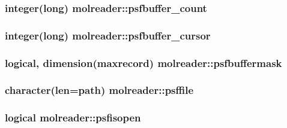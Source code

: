 \hypertarget{classmolreader_af2dddaa7f6249a39287ffcdcbe2ce558}{
\subsubsection[{psfbuffer\+\_\+count}]{\setlength{\rightskip}{0pt plus 5cm}integer(long) molreader\+::psfbuffer\+\_\+count\hspace{0.3cm}{\ttfamily [private]}}}\label{classmolreader_af2dddaa7f6249a39287ffcdcbe2ce558}
\hypertarget{classmolreader_ab080c636a2423beb139bdd65dcd884c3}{
\subsubsection[{psfbuffer\+\_\+cursor}]{\setlength{\rightskip}{0pt plus 5cm}integer(long) molreader\+::psfbuffer\+\_\+cursor\hspace{0.3cm}{\ttfamily [private]}}}\label{classmolreader_ab080c636a2423beb139bdd65dcd884c3}
\hypertarget{classmolreader_a747bd2c32990916c313506c805317e88}{
\subsubsection[{psfbuffermask}]{\setlength{\rightskip}{0pt plus 5cm}logical, dimension({\bf maxrecord}) molreader\+::psfbuffermask\hspace{0.3cm}{\ttfamily [private]}}}\label{classmolreader_a747bd2c32990916c313506c805317e88}
\hypertarget{classmolreader_a48ac5c969e35417342bb66a57adec842}{
\subsubsection[{psffile}]{\setlength{\rightskip}{0pt plus 5cm}character(len=path) molreader\+::psffile\hspace{0.3cm}{\ttfamily [private]}}}\label{classmolreader_a48ac5c969e35417342bb66a57adec842}
\hypertarget{classmolreader_ae5cd9063d12a39b0e8266e184439c808}{
\subsubsection[{psfisopen}]{\setlength{\rightskip}{0pt plus 5cm}logical molreader\+::psfisopen\hspace{0.3cm}{\ttfamily [private]}}}\label{classmolreader_ae5cd9063d12a39b0e8266e184439c808}
